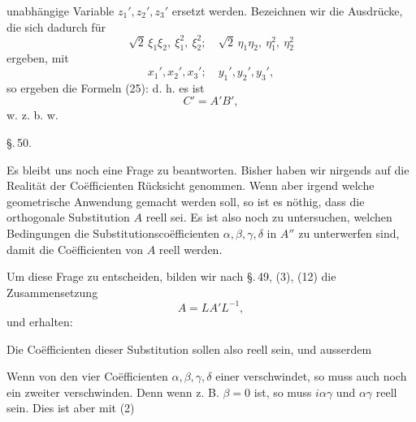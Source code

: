 unabhängige Variable $z_1', z_2', z_3'$ ersetzt werden. Bezeichnen wir
die Ausdrücke, die sich dadurch für
\[ \sqrt{2}\,\xi_1\xi_2,\ \xi_1^2,\ \xi_2^2;\quad \sqrt{2}\,\eta_1\eta_2,\ \eta_1^2,\ \eta_2^2 \]
ergeben, mit
\[ x_1', x_2', x_3';\quad y_1', y_2', y_3', \]
so ergeben die Formeln (25):
d. h. es ist
\[ C' = A'B', \]
w. z. b. w.

\begin{center}
\S.\,50.

\end{center}

Es bleibt uns noch eine Frage zu beantworten. Bisher haben
wir nirgends auf die Realität der Coëfficienten Rücksicht genommen.
Wenn aber irgend welche geometrische Anwendung
gemacht werden soll, so ist es nöthig, dass die orthogonale Substitution
 $A$ reell sei. Es ist also noch zu untersuchen, welchen
Bedingungen die Substitutionscoëfficienten $\alpha, \beta, \gamma, \delta$ in $A''$ zu
unterwerfen sind, damit die Coëfficienten von $A$ reell werden.

Um diese Frage zu entscheiden, bilden wir nach \S.\,49, (3), (12)
die Zusammensetzung
\[ A = LA'L^{-1}, \]
und erhalten:

Die Coëfficienten dieser Substitution sollen also reell sein,
und ausserdem

Wenn von den vier Coëfficienten $\alpha, \beta, \gamma, \delta$ einer verschwindet,
so muss auch noch ein zweiter verschwinden. Denn wenn z. B.
$\beta = 0$ ist, so muss $i\alpha\gamma$ und $\alpha\gamma$ reell sein. Dies ist aber mit (2)
